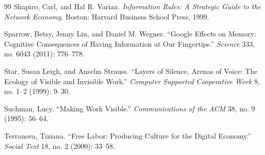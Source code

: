 \documentclass[12pt]{article}
\begin{document}
\begin{thebibliography}{99}
Shapiro, Carl, and Hal R. Varian. \emph{Information Rules: A Strategic Guide to the Network Economy}. Boston: Harvard Business School Press, 1999.

Sparrow, Betsy, Jenny Liu, and Daniel M. Wegner. ``Google Effects on Memory: Cognitive Consequences of Having Information at Our Fingertips.'' \emph{Science} 333, no. 6043 (2011): 776--778.

Star, Susan Leigh, and Anselm Strauss. ``Layers of Silence, Arenas of Voice: The Ecology of Visible and Invisible Work.'' \emph{Computer Supported Cooperative Work} 8, no. 1--2 (1999): 9--30.

Suchman, Lucy. ``Making Work Visible.'' \emph{Communications of the ACM} 38, no. 9 (1995): 56--64.

Terranova, Tiziana. ``Free Labor: Producing Culture for the Digital Economy.'' \emph{Social Text} 18, no. 2 (2000): 33--58.

\end{thebibliography}
\end{document}
